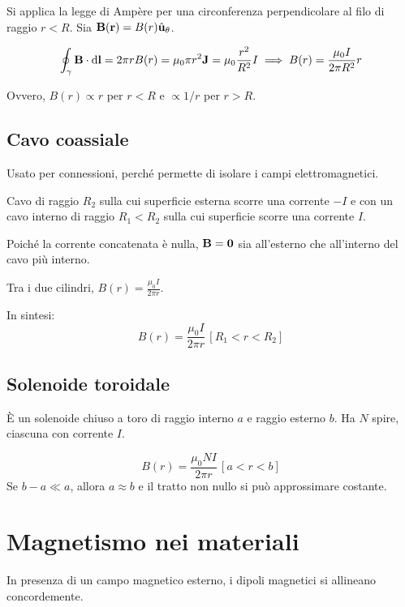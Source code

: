 Si applica la legge di Ampère per una circonferenza perpendicolare al filo di raggio $r < R$.
Sia $\mathbf{B}(\mathbf{r}) = B(r) \hat{\mathbf{u}}_{\theta}$.

\begin{equation}
    \oint_\gamma \mathbf{B} \cdot \mathrm{d} \mathbf{l} = 2\pi r B(r)
    = \mu_0 \pi r^2 \mathbf{J}
    = \mu_0 \frac{r^2}{R^2} I
    \implies B(r) = \frac{\mu_0 I}{2\pi R^2} r
\end{equation}

Ovvero, $B(r) \propto r$ per $r < R$ e $\propto 1/r$ per $r > R$.

\subsection{Cavo coassiale}

Usato per connessioni, perché permette di isolare i campi elettromagnetici.

Cavo di raggio $R_2$ sulla cui superficie esterna scorre una corrente $-I$ e con un cavo interno di raggio $R_1 < R_2$ sulla cui superficie scorre una corrente $I$.

Poiché la corrente concatenata è nulla, $\mathbf{B} = \mathbf{0}$ sia all'esterno che all'interno del cavo più interno.

Tra i due cilindri, $B(r) = \frac{\mu_0 I}{2\pi r}$.

In sintesi:
\begin{equation}
    B(r) = \frac{\mu_0 I}{2\pi r} \, [R_1 < r < R_2]
\end{equation}

\subsection{Solenoide toroidale}

È un solenoide chiuso a toro di raggio interno $a$ e raggio esterno $b$.
Ha $N$ spire, ciascuna con corrente $I$.

\begin{equation}
    B(r) = \frac{\mu_0 N I}{2\pi r} \, [a < r < b]
\end{equation}
Se $b - a \ll a$, allora $a \approx b$ e il tratto non nullo si può approssimare costante.

\section{Magnetismo nei materiali}

In presenza di un campo magnetico esterno, i dipoli magnetici si allineano concordemente.

